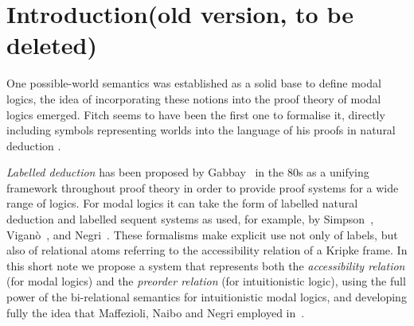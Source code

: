 

\section*{Introduction(old version, to be deleted)}

One possible-world semantics was established as a solid base to define modal logics, the idea of incorporating these notions into the proof theory of modal logics emerged. Fitch seems to have been the first one to formalise it, directly including symbols representing worlds into the language of his proofs in natural deduction \cite{Fitch}.

\emph{Labelled deduction} has been proposed by Gabbay~\cite{Gabbay} in the 80s as a unifying framework throughout proof theory in order to provide proof
systems for a wide range of logics. 
%
For modal logics it can take
the form of labelled natural deduction and labelled sequent systems as
used, for example, by Simpson~\cite{Simpson}, Vigan\`o~\cite{Vigano}, and
Negri~\cite{Negri}. 
%
These formalisms make explicit use not only of
labels, but also of relational atoms referring to the accessibility relation of a Kripke frame.
%
In this short note we propose a system that represents both the \emph{accessibility relation} (for modal
logics) and the \emph{preorder relation} (for intuitionistic
logic), using the full power of the bi-relational semantics for
intuitionistic modal logics,
and developing fully the idea that Maffezioli, Naibo and Negri employed in~\cite{Maffezioli}. 


  
